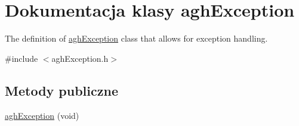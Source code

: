 \hypertarget{classaghException}{\section{Dokumentacja klasy agh\+Exception}
\label{classaghException}
}


The definition of \hyperlink{classaghException}{agh\+Exception} class that allows for exception handling.  




{\ttfamily \#include $<$agh\+Exception.\+h$>$}

\subsection*{Metody publiczne}
\begin{DoxyCompactItemize}
\item 
\hypertarget{classaghException_a4823634f8bfb0fe7338b49f0e26fc90a}{\hyperlink{classaghException_a4823634f8bfb0fe7338b49f0e26fc90a}{agh\+Exception} (void)}\label{classaghException_a4823634f8bfb0fe7338b49f0e26fc90a}


\end{DoxyCompactItemize}
